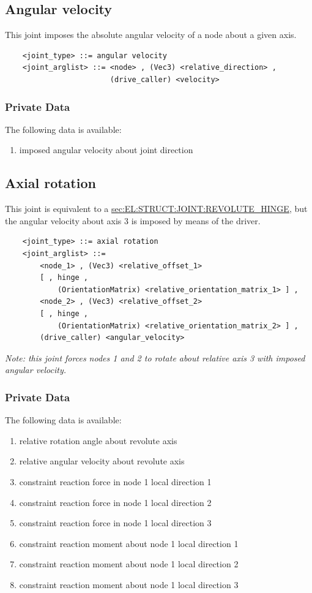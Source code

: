 \subsection{Angular velocity}
This joint imposes the absolute angular velocity of a node
about a given axis.
\begin{verbatim}
    <joint_type> ::= angular velocity
    <joint_arglist> ::= <node> , (Vec3) <relative_direction> , 
                        (drive_caller) <velocity>
\end{verbatim}

\subsubsection{Private Data}
The following data is available:
\begin{enumerate}
\item {} imposed angular velocity about joint direction
\end{enumerate}

\subsection{Axial rotation}
\label{sec:EL:STRUCT:JOINT:AXIAL_ROTATION}
This joint is equivalent to a
\hyperref{\kw{revolute hinge}}{\kw{revolute hinge} (see Section~}{)}{sec:EL:STRUCT:JOINT:REVOLUTE_HINGE},
but the angular velocity about axis 3 is imposed by means of the driver.
\begin{verbatim}
    <joint_type> ::= axial rotation
    <joint_arglist> ::= 
        <node_1> , (Vec3) <relative_offset_1> 
        [ , hinge , 
            (OrientationMatrix) <relative_orientation_matrix_1> ] ,
        <node_2> , (Vec3) <relative_offset_2>
        [ , hinge , 
            (OrientationMatrix) <relative_orientation_matrix_2> ] ,
        (drive_caller) <angular_velocity>
\end{verbatim}
{\em
    Note: this joint forces nodes 1 and 2 to rotate about relative 
    axis 3 with imposed angular velocity.
}

\subsubsection{Private Data}
The following data is available:
\begin{enumerate}
\item {} relative rotation angle about revolute axis
\item {} relative angular velocity about revolute axis
\item {} constraint reaction force in node 1 local direction 1
\item {} constraint reaction force in node 1 local direction 2
\item {} constraint reaction force in node 1 local direction 3
\item {} constraint reaction moment about node 1 local direction 1
\item {} constraint reaction moment about node 1 local direction 2
\item {} constraint reaction moment about node 1 local direction 3
\end{enumerate}

